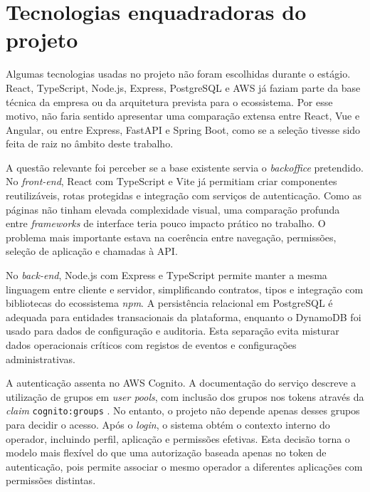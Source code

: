 \section{Tecnologias enquadradoras do projeto}
\label{sec:tecnologias_enquadradoras}

Algumas tecnologias usadas no projeto não foram escolhidas durante o estágio. React, TypeScript, Node.js, Express, PostgreSQL e \gls{AWS} já faziam parte da base técnica da empresa ou da arquitetura prevista para o ecossistema. Por esse motivo, não faria sentido apresentar uma comparação extensa entre React, Vue e Angular, ou entre Express, FastAPI e Spring Boot, como se a seleção tivesse sido feita de raiz no âmbito deste trabalho.

A questão relevante foi perceber se a base existente servia o \textit{backoffice} pretendido. No \textit{front-end}, React com TypeScript e Vite já permitiam criar componentes reutilizáveis, rotas protegidas e integração com serviços de autenticação. Como as páginas não tinham elevada complexidade visual, uma comparação profunda entre \textit{frameworks} de interface teria pouco impacto prático no trabalho. O problema mais importante estava na coerência entre navegação, permissões, seleção de aplicação e chamadas à \gls{API}.

No \textit{back-end}, Node.js com Express e TypeScript permite manter a mesma linguagem entre cliente e servidor, simplificando contratos, tipos e integração com bibliotecas do ecossistema \textit{npm}. A persistência relacional em PostgreSQL é adequada para entidades transacionais da plataforma, enquanto o DynamoDB foi usado para dados de configuração e auditoria. Esta separação evita misturar dados operacionais críticos com registos de eventos e configurações administrativas.

A autenticação assenta no AWS Cognito. A documentação do serviço descreve a utilização de grupos em \textit{user pools}, com inclusão dos grupos nos tokens através da \textit{claim} \texttt{cognito:groups} \cite{AWSCognitoGroups}. No entanto, o projeto não depende apenas desses grupos para decidir o acesso. Após o \textit{login}, o sistema obtém o contexto interno do operador, incluindo perfil, aplicação e permissões efetivas. Esta decisão torna o modelo mais flexível do que uma autorização baseada apenas no token de autenticação, pois permite associar o mesmo operador a diferentes aplicações com permissões distintas.


